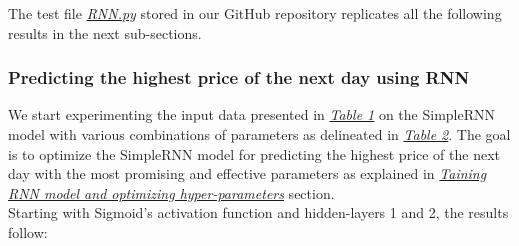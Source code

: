The test file \href{https://github.com/fabiorodp/UiO-FYS-STK4155/tree/master/Project3/RNN.py}{\textit{RNN.py}} stored in our GitHub repository replicates all the following results in the next sub-sections.

\subsubsection{Predicting the highest price of the next day using RNN}
\label{chap:Predicting the highest price of the next day using RNN}

\quad We start experimenting the input data presented in \hyperref[table:TrainingFeatures]{\textit{Table 1}} on the SimpleRNN model with various combinations of parameters as delineated in \hyperref[table:Hyper-parameters for SimpleRNN]{\textit{Table 2}}. The goal is to optimize the SimpleRNN model for predicting the highest price of the next day with the most promising and effective parameters as explained in \hyperref[chap:Training RNN model and optimizing hyper-parameters]{\textit{Taining RNN model and optimizing hyper-parameters}} section.\\

Starting with Sigmoid's activation function and hidden-layers 1 and 2, the results follow:

